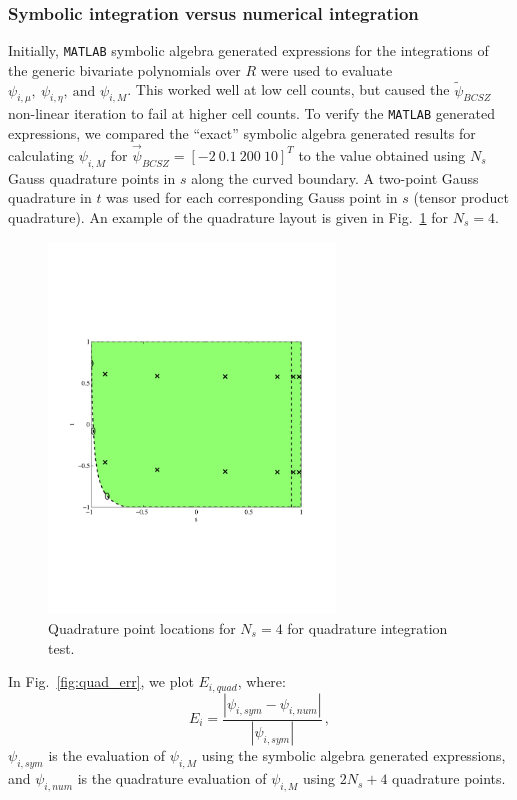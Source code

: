 \documentclass{mc2015}
\newcommand{\fig}[1]{Fig.~\ref{#1}}                      %
\newcommand{\benum}{\begin{equation}} 			%
\newcommand{\eenum}{\end{equation}}
\newcommand{\abs}[1]{\ensuremath{\left\lvert #1 \right\rvert}}
\newcommand{\BCSZ}{\ensuremath{\widetilde{\psi}_{BCSZ}}}
\newcommand{\pec}{\, ,}
\begin{document}
\subsubsection{Symbolic integration versus numerical integration}

Initially, \verb+MATLAB+\cite{matlab} symbolic algebra generated expressions for the integrations of the generic bivariate polynomials over $R$ were used to evaluate $\psi_{i,\mu},~\psi_{i,\eta},~\text{and }\psi_{i,M}$.  This worked well at low cell counts, but caused the \BCSZ non-linear iteration to fail at higher cell counts.
To verify the \verb+MATLAB+ generated expressions, we compared the ``exact'' symbolic algebra generated results for calculating $\psi_{i,M}$ for $\vec{\psi}_{BCSZ} = [-2 ~0.1~200~10]^T$ to the value obtained using $N_s$ Gauss quadrature points in $s$ along the curved boundary.  
A two-point Gauss quadrature in $t$ was used for each corresponding Gauss point in $s$ (tensor product quadrature).  An example of the quadrature layout is given in \fig{fig:quad} for $N_s = 4$.
\begin{figure}[h]
\centering
\includegraphics[width=3in,trim=0.5in  2.5in  1.in 2.5in,clip=true]{quad_layout.pdf}
\caption{Quadrature point locations for $N_s = 4$ for quadrature integration test.}
\label{fig:quad}
\end{figure}
In \fig{fig:quad_err}, we plot $E_{i,quad}$, where:
\benum
E_{i} = \frac{\abs{ \psi_{i,sym} - \psi_{i,num} }}{\abs{\psi_{i,sym} }} \pec
\eenum
$\psi_{i,sym}$ is the evaluation of $\psi_{i,M}$ using the symbolic algebra generated expressions, and $\psi_{i,num}$ is the quadrature evaluation of $\psi_{i,M}$ using $2N_s + 4$ quadrature points.
\end{document}
